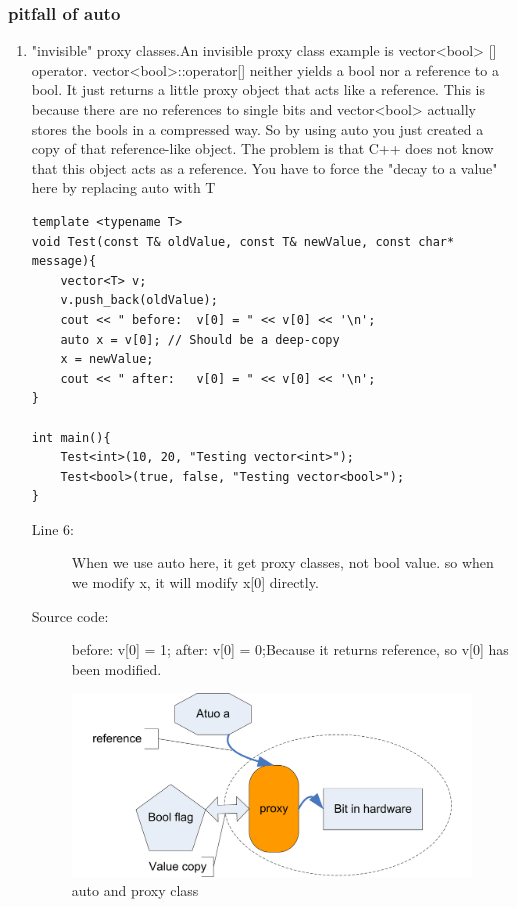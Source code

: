 \documentclass[a4paper,11pt,twoside]{book}
\begin{document}
\subsubsection{pitfall of auto}
	\begin{enumerate}
		\item "invisible" proxy classes.An invisible proxy class example is vector<bool> [] operator. vector<bool>::operator[] neither yields a bool nor a reference to a bool. It just returns a little proxy object that acts like a reference. This is because there are no references to single bits and vector<bool> actually stores the bools in a compressed way. So by using auto you just created a copy of that reference-like object. The problem is that C++ does not know that this object acts as a reference. You have to force the "decay to a value" here by replacing auto with T
\begin{lstlisting}
template <typename T>
void Test(const T& oldValue, const T& newValue, const char* message){
	vector<T> v;
	v.push_back(oldValue);
	cout << " before:  v[0] = " << v[0] << '\n';
	auto x = v[0]; // Should be a deep-copy
	x = newValue;
	cout << " after:   v[0] = " << v[0] << '\n';
}

int main(){
	Test<int>(10, 20, "Testing vector<int>");
	Test<bool>(true, false, "Testing vector<bool>");
}
\end{lstlisting}
\begin{description}
	\item[Line 6:] When we use auto here, it get proxy classes, not bool value. so when we modify x, it will modify x[0] directly.
	
	\item[Source code:] before:  v[0] = 1; after:   v[0] = 0;Because it returns reference,  so v[0] has been modified.
\end{description}

\begin{figure}[h]
	\centering
	\includegraphics[width=0.7\linewidth]{pics/auto2.png}
	\caption{auto and proxy class}
	\label{fig:auto2}
\end{figure}




\end{enumerate}
\end{document}
